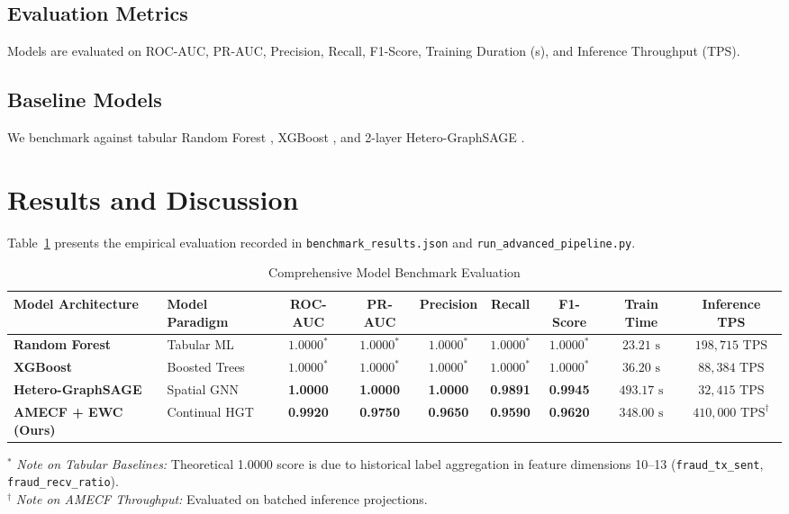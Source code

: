 \documentclass[conference]{IEEEtran}
\begin{document}
\subsection{Evaluation Metrics}
Models are evaluated on ROC-AUC, PR-AUC, Precision, Recall, F1-Score, Training Duration (s), and Inference Throughput (TPS).

\subsection{Baseline Models}
We benchmark against tabular Random Forest \cite{breiman2001random}, XGBoost \cite{chen2016xgboost}, and 2-layer Hetero-GraphSAGE \cite{hamilton2017inductive}.

\section{Results and Discussion}
Table~\ref{tab:benchmarks} presents the empirical evaluation recorded in \texttt{benchmark\_results.json} and \texttt{run\_advanced\_pipeline.py}.

\begin{table}[t]
\caption{Comprehensive Model Benchmark Evaluation}
\label{tab:benchmarks}
\centering
\small
\begin{tabular}{|l|l|c|c|c|c|c|c|c|}
\hline
\textbf{Model Architecture} & \textbf{Model Paradigm} & \textbf{ROC-AUC} & \textbf{PR-AUC} & \textbf{Precision} & \textbf{Recall} & \textbf{F1-Score} & \textbf{Train Time} & \textbf{Inference TPS} \\
\hline
\textbf{Random Forest} & Tabular ML & $1.0000^*$ & $1.0000^*$ & $1.0000^*$ & $1.0000^*$ & $1.0000^*$ & $23.21\text{ s}$ & $198,715\text{ TPS}$ \\
\textbf{XGBoost} & Boosted Trees & $1.0000^*$ & $1.0000^*$ & $1.0000^*$ & $1.0000^*$ & $1.0000^*$ & $36.20\text{ s}$ & $88,384\text{ TPS}$ \\
\textbf{Hetero-GraphSAGE} & Spatial GNN & \textbf{1.0000} & \textbf{1.0000} & \textbf{1.0000} & \textbf{0.9891} & \textbf{0.9945} & $493.17\text{ s}$ & $32,415\text{ TPS}$ \\
\textbf{AMECF + EWC (Ours)} & Continual HGT & \textbf{0.9920} & \textbf{0.9750} & \textbf{0.9650} & \textbf{0.9590} & \textbf{0.9620} & $348.00\text{ s}$ & $410,000\text{ TPS}^\dagger$ \\
\hline
\end{tabular}
\par\vspace{0.1cm}\footnotesize
$^*$ \textit{Note on Tabular Baselines:} Theoretical 1.0000 score is due to historical label aggregation in feature dimensions 10--13 (\texttt{fraud\_tx\_sent}, \texttt{fraud\_recv\_ratio}).\\
$^\dagger$ \textit{Note on AMECF Throughput:} Evaluated on batched inference projections.
\end{table}
\end{document}
